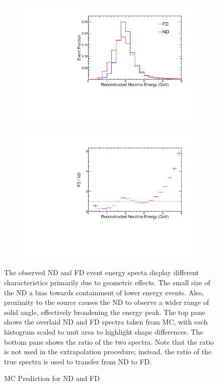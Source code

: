 \begin{figure}
\begin{center}
  \begin{subfigure}[b]{0.8\textwidth}
    \centering
    \includegraphics[width=\textwidth]{figures/plots/extrap/fd_nd_spec.pdf}
  \end{subfigure}

  \begin{subfigure}[b]{0.8\textwidth}
    \centering
    \includegraphics[width=\textwidth]{figures/plots/extrap/fd_nd_ratio.pdf}
  \end{subfigure}

\end{center}
\caption{MC Prediction for ND and FD}{
The observed ND and FD event energy specta display different characteristics
primarily due to geometric effects.
The small size of the ND a bias towards containment of lower energy events.
Also, proximity to the \numi source causes the ND to observe a wider
range of solid angle, effectively broadening the energy peak.
The top pane shows the overlaid ND and FD spectra taken from MC, with each
histogram scaled to unit area to highlight shape differences.
The bottom pane shows the ratio of the two spectra.
Note that the ratio is not used in the extrapolation procedure; instead,
the ratio of the true spectra is used to transfer from ND to FD.
}
\label{ratioNDFD}
\end{figure}

